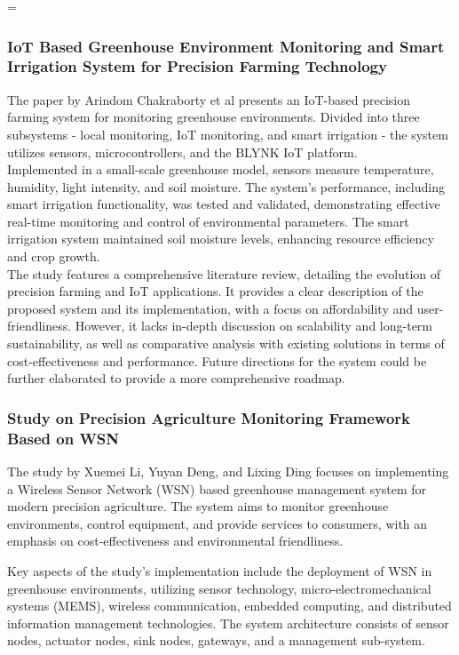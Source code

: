 =\documentclass[12pt, a4paper]{article}
\begin{document}
\subsubsection{IoT Based Greenhouse Environment Monitoring and Smart Irrigation System for Precision Farming Technology}
The paper by Arindom Chakraborty et al\cite{chakraborty2022iot} presents an IoT-based precision farming system for monitoring greenhouse environments. Divided into three subsystems - local monitoring, IoT monitoring, and smart irrigation - the system utilizes sensors, microcontrollers, and the BLYNK IoT platform.\\
Implemented in a small-scale greenhouse model, sensors measure temperature, humidity, light intensity, and soil moisture. The system's performance, including smart irrigation functionality, was tested and validated, demonstrating effective real-time monitoring and control of environmental parameters. The smart irrigation system maintained soil moisture levels, enhancing resource efficiency and crop growth.\\
The study features a comprehensive literature review, detailing the evolution of precision farming and IoT applications. It provides a clear description of the proposed system and its implementation, with a focus on affordability and user-friendliness. However, it lacks in-depth discussion on scalability and long-term sustainability, as well as comparative analysis with existing solutions in terms of cost-effectiveness and performance. Future directions for the system could be further elaborated to provide a more comprehensive roadmap.

\subsubsection{Study on Precision Agriculture Monitoring Framework Based on WSN}
The study by Xuemei Li, Yuyan Deng, and Lixing Ding\cite{li2008study} focuses on implementing a Wireless Sensor Network (WSN) based greenhouse management system for modern precision agriculture. The system aims to monitor greenhouse environments, control equipment, and provide services to consumers, with an emphasis on cost-effectiveness and environmental friendliness.

Key aspects of the study's implementation include the deployment of WSN in greenhouse environments, utilizing sensor technology, micro-electromechanical systems (MEMS), wireless communication, embedded computing, and distributed information management technologies. The system architecture consists of sensor nodes, actuator nodes, sink nodes, gateways, and a management sub-system.
\end{document}
